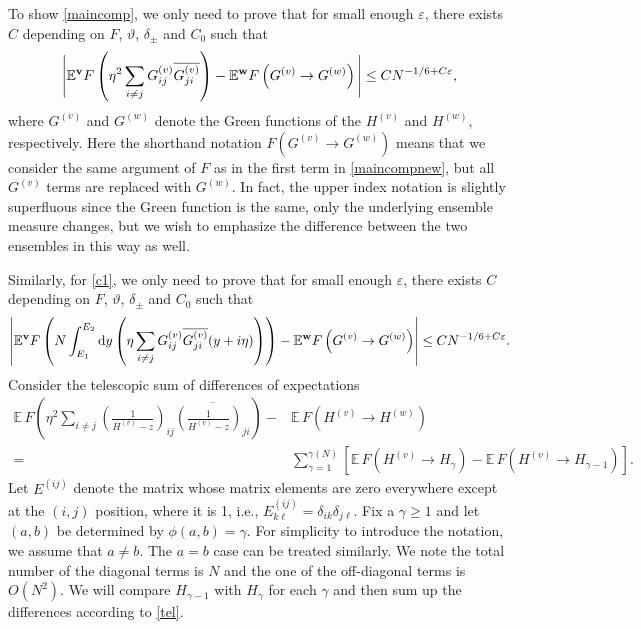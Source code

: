 \documentclass[draft]{article}
\newcommand{\ttau}{\vartheta}
\newcommand{\e}{\varepsilon}
\newcommand{\rd}{{\rm d}}
\newcommand{\non}{\nonumber}
\newcommand{\bv}{{\bf{v}}}
\newcommand{\bw}{{\bf{w}}}
\newcommand{\be}{\begin{equation}}
\newcommand{\ee}{\end{equation}}
\newcommand{\E}{{\mathbb E }}
\numberwithin{equation}{section}
\numberwithin{theorem}{section}
\numberwithin{definition}{section}
\numberwithin{remark}{section}
\begin{document}
To show \eqref{maincomp}, we only need to  prove that for small enough $\e$, 
there exists $C$ depending on $F$,  $\ttau$, $\delta_\pm$ and $C_0$ such that
\begin{align}\label{maincompnew}
\Bigg|\E^\bv F\left (   
\eta^2 \sum_{i\neq j}G_{ij}^{(v)}\overline {G_{ji}^{(v)}}\right)   -
  \E^\bw F\left ( G^{(v)} \to  G^{(w)}\right )  \Bigg| \le CN^{-1/6+C\e},
\end{align}
where $G^{(v)}$ and $G^{(w)}$ denote the Green functions of the $H^{(v)}$ and $H^{(w)}$,
respectively.
Here the shorthand notation $F\left ( G^{(v)} \to  G^{(w)}\right ) $
means that we consider the same argument of $F$ as in 
the first term in \eqref{maincompnew}, but all $G^{(v)}$
terms are replaced with $G^{(w)}$.
In fact, the upper index notation is slightly superfluous since the Green function
is the same, only the underlying ensemble measure changes, but
we wish to emphasize the difference between the two ensembles in this way as well.

Similarly, for \eqref{c1}, we only need to  prove that for small enough $\e$, there 
exists $C$ depending on $F$,  $\ttau$, $\delta_\pm$ and $C_0$ such that
\be\label{c1new}
\left|
\E^\bv  F\left(N \int_{E_1}^{E_2} \rd y  \left (   
\eta \sum_{i\neq j}G_{ij}^{(v)}\overline {G_{ji}^{(v)}}(y+i\eta)\right)\right) -
\E^\bw  F\left ( G^{(v)} \to  G^{(w)}\right )
\right|\leq C N^{-1/6+C \e}.
\ee
Consider the telescopic sum of differences of expectations 
\begin{align}\label{tel}
\E \, F \left (\eta^2 \sum_{i\neq j}\left(\frac{1}{H^{(v)}-z}\right)_{ij}
\overline{\left(\frac{1}{H^{(v)}-z}\right)_{ji}} \right )   - 
 & \E \, F \left  ( H^{(v)}\to H^{(w) }\right )  \\
= & \sum_{\gamma=1}^{\gamma(N)}\left[  \E \, F \left ( H^{(v)}\to H_{\gamma }\right ) 
-  \E \, F \left ( H^{(v)}\to H_{\gamma-1 } \right ) \right] . \non
\end{align}
Let $E^{(ij)}$ denote the matrix whose matrix elements are zero everywhere except
at the $(i,j)$ position, where it is 1, i.e.,  $E^{(ij)}_{k\ell}=\delta_{ik}\delta_{j\ell}$.
Fix a $\gamma\ge 1$ and let $(a,b)$ be determined by  $\phi (a, b) = \gamma$. For simplicity
to introduce the notation, 
we assume that $a\neq b$. The  $a=b$ case
can be treated similarly. We note the total number 
of the diagonal terms is $N$ and the one of the off-diagonal terms is $O(N^2)$.  
We will compare $H_{\gamma-1}$ with $H_\gamma$ for each $\gamma$
and then sum up the differences according to \eqref{tel}.
\end{document}
